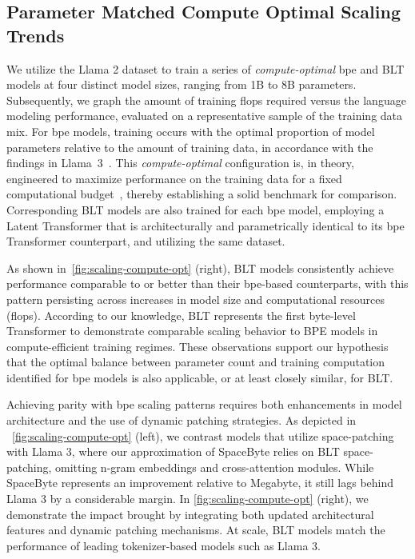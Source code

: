 \subsection{Parameter Matched Compute Optimal Scaling Trends}
\label{section:parameter-matched-scaling}
We utilize the Llama 2 dataset to train a series of \textit{compute-optimal} bpe and {\textsc BLT} models at four distinct model sizes, ranging from 1B to 8B parameters. Subsequently, we graph the amount of training flops required versus the language modeling performance, evaluated on a representative sample of the training data mix. For bpe models, training occurs with the optimal proportion of model parameters relative to the amount of training data, in accordance with the findings in Llama~3~\citep{dubey2024llama}. This \textit{compute-optimal} configuration is, in theory, engineered to maximize performance on the training data for a fixed computational budget~\citep{hoffmann2022training}, thereby establishing a solid benchmark for comparison. Corresponding {\textsc BLT} models are also trained for each bpe model, employing a Latent Transformer that is architecturally and parametrically identical to its bpe Transformer counterpart, and utilizing the same dataset.

As shown in~\autoref{fig:scaling-compute-opt} (right), {\textsc BLT} models consistently achieve performance comparable to or better than their bpe-based counterparts, with this pattern persisting across increases in model size and computational resources (flops). According to our knowledge, {\textsc BLT} represents the first byte-level Transformer to demonstrate comparable scaling behavior to BPE models in compute-efficient training regimes. These observations support our hypothesis that the optimal balance between parameter count and training computation identified for bpe models is also applicable, or at least closely similar, for {\textsc BLT}.

Achieving parity with bpe scaling patterns requires both enhancements in model architecture and the use of dynamic patching strategies. As depicted in ~\autoref{fig:scaling-compute-opt} (left), we contrast models that utilize space-patching with Llama 3, where our approximation of SpaceByte \citep{slagle2024spacebyte} relies on {\textsc BLT} space-patching, omitting n-gram embeddings and cross-attention modules. While SpaceByte represents an improvement relative to Megabyte, it still lags behind Llama 3 by a considerable margin. In \autoref{fig:scaling-compute-opt} (right), we demonstrate the impact brought by integrating both updated architectural features and dynamic patching mechanisms. At scale, {\textsc BLT} models match the performance of leading tokenizer-based models such as Llama 3.

